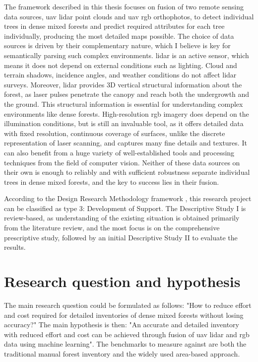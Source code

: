 The framework described in this thesis focuses on fusion of two remote sensing data sources, \gls{uav} \gls{lidar} point clouds and \gls{uav} \gls{rgb} orthophotos, to detect individual trees in dense mixed forests and predict required attributes for each tree individually, producing the most detailed maps possible.
The choice of data sources is driven by their complementary nature, which I believe is key for semantically parsing such complex environments.
\gls{lidar} is an active sensor, which means it does not depend on external conditions such as lighting.
Cloud and terrain shadows, incidence angles, and weather conditions do not affect \gls{lidar} surveys.
Moreover, \gls{lidar} provides 3D vertical structural information about the forest, as laser pulses penetrate the canopy and reach both the undergrowth and the ground.
This structural information is essential for understanding complex environments like dense forests.
High-resolution \gls{rgb} imagery does depend on the illumination conditions, but is still an invaluable tool, as it offers detailed data with fixed resolution, continuous coverage of surfaces, unlike the discrete representation of laser scanning, and captures many fine details and textures.
It can also benefit from a huge variety of well-established tools and processing techniques from the field of computer vision.
Neither of these data sources on their own is enough to reliably and with sufficient robustness separate individual trees in dense mixed forests, and the key to success lies in their fusion.

According to the Design Research Methodology framework \citep{blessingDRMDesignResearch2009}, this research project can be classified as type 3: Development of Support.
The Descriptive Study I is review-based, as understanding of the existing situation is obtained primarily from the literature review, and the most focus is on the comprehensive prescriptive study, followed by an initial Descriptive Study II to evaluate the results.

\section{Research question and hypothesis}\label{sec-research-question}

The main research question could be formulated as follows: "How to reduce effort and cost required for detailed inventories of dense mixed forests without losing accuracy?"
The main hypothesis is then: "An accurate and detailed inventory with reduced effort and cost can be achieved through fusion of \gls{uav} \gls{lidar} and \gls{rgb} data using machine learning".
The benchmarks to measure against are both the traditional manual forest inventory and the widely used area-based approach.

